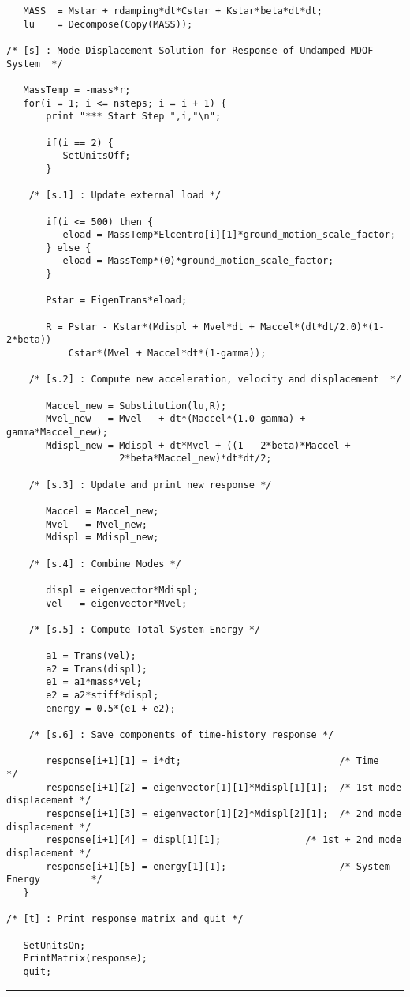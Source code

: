 \begin{footnotesize}
\begin{verbatim}
   MASS  = Mstar + rdamping*dt*Cstar + Kstar*beta*dt*dt;
   lu    = Decompose(Copy(MASS));

/* [s] : Mode-Displacement Solution for Response of Undamped MDOF System  */

   MassTemp = -mass*r;
   for(i = 1; i <= nsteps; i = i + 1) {
       print "*** Start Step ",i,"\n";

       if(i == 2) {
          SetUnitsOff;
       }

    /* [s.1] : Update external load */

       if(i <= 500) then {
          eload = MassTemp*Elcentro[i][1]*ground_motion_scale_factor;
       } else {
          eload = MassTemp*(0)*ground_motion_scale_factor;
       }

       Pstar = EigenTrans*eload;

       R = Pstar - Kstar*(Mdispl + Mvel*dt + Maccel*(dt*dt/2.0)*(1-2*beta)) -
           Cstar*(Mvel + Maccel*dt*(1-gamma));

    /* [s.2] : Compute new acceleration, velocity and displacement  */

       Maccel_new = Substitution(lu,R); 
       Mvel_new   = Mvel   + dt*(Maccel*(1.0-gamma) + gamma*Maccel_new);
       Mdispl_new = Mdispl + dt*Mvel + ((1 - 2*beta)*Maccel +
                    2*beta*Maccel_new)*dt*dt/2;

    /* [s.3] : Update and print new response */

       Maccel = Maccel_new;
       Mvel   = Mvel_new;
       Mdispl = Mdispl_new;

    /* [s.4] : Combine Modes */

       displ = eigenvector*Mdispl;
       vel   = eigenvector*Mvel;

    /* [s.5] : Compute Total System Energy */

       a1 = Trans(vel);
       a2 = Trans(displ);
       e1 = a1*mass*vel;
       e2 = a2*stiff*displ;
       energy = 0.5*(e1 + e2);

    /* [s.6] : Save components of time-history response */

       response[i+1][1] = i*dt;                            /* Time                  */
       response[i+1][2] = eigenvector[1][1]*Mdispl[1][1];  /* 1st mode displacement */
       response[i+1][3] = eigenvector[1][2]*Mdispl[2][1];  /* 2nd mode displacement */
       response[i+1][4] = displ[1][1];               /* 1st + 2nd mode displacement */
       response[i+1][5] = energy[1][1];                    /* System Energy         */
   }

/* [t] : Print response matrix and quit */

   SetUnitsOn;
   PrintMatrix(response);
   quit;
\end{verbatim}
\rule{6.25 in}{0.035 in}
\end{footnotesize}

